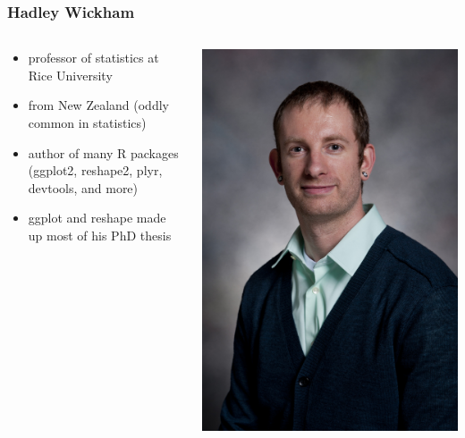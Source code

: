 \documentclass{beamer}\usepackage{graphicx, color}
\begin{document}
\begin{frame}
  \frametitle{Hadley Wickham}

  \begin{columns}
    \begin{column}{0.5\textwidth}
      \begin{itemize}
        \item professor of statistics at Rice University
        \item from New Zealand (oddly common in statistics)
        \item author of many R packages (ggplot2, reshape2, plyr, devtools, and more)
        \item ggplot and reshape made up most of his PhD thesis
      \end{itemize}
    \end{column}
    \begin{column}{0.5\textwidth}
      \includegraphics[width = \textwidth, keepaspectratio = true]{figure/hw}
    \end{column}
  \end{columns}

\end{frame}
\end{document}
